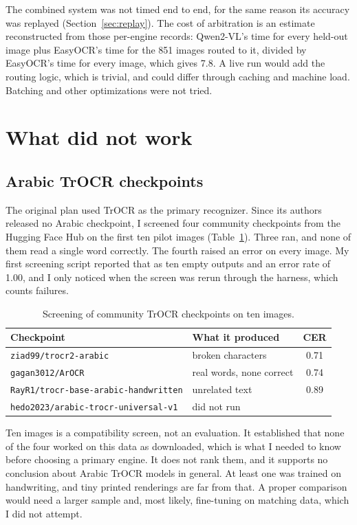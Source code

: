 \documentclass[11pt,a4paper]{article}
\begin{document}
The combined system was not timed end to end, for the same reason its
accuracy was replayed (Section~\ref{sec:replay}). The cost of arbitration is
an estimate reconstructed from those per-engine records: Qwen2-VL's time for
every held-out image plus EasyOCR's time for the 851 images routed to it,
divided by EasyOCR's time for every image, which gives 7.8. A live run would
add the routing logic, which is trivial, and could differ through caching and
machine load. Batching and other optimizations were not tried.

\section{What did not work}

\subsection{Arabic TrOCR checkpoints}

The original plan used TrOCR as the primary recognizer. Since its authors
released no Arabic checkpoint, I screened four community checkpoints from the
Hugging Face Hub on the first ten pilot images (Table~\ref{tab:trocr}). Three
ran, and none of them read a single word correctly. The fourth raised an error
on every image. My first screening script reported that as ten empty outputs
and an error rate of 1.00, and I only noticed when the screen was rerun
through the harness, which counts failures.

\begin{table}[H]
\centering
\small
\begin{tabular}{llc}
\toprule
Checkpoint & What it produced & CER \\
\midrule
\texttt{ziad99/trocr2-arabic} & broken characters & 0.71 \\
\texttt{gagan3012/ArOCR} & real words, none correct & 0.74 \\
\texttt{RayR1/trocr-base-arabic-handwritten} & unrelated text & 0.89 \\
\texttt{hedo2023/arabic-trocr-universal-v1} & did not run & \\
\bottomrule
\end{tabular}
\caption{Screening of community TrOCR checkpoints on ten images.}
\label{tab:trocr}
\end{table}

Ten images is a compatibility screen, not an evaluation. It established that
none of the four worked on this data as downloaded, which is what I needed to
know before choosing a primary engine. It does not rank them, and it supports
no conclusion about Arabic TrOCR models in general. At least one was trained
on handwriting, and tiny printed renderings are far from that. A proper
comparison would need a larger sample and, most likely, fine-tuning on
matching data, which I did not attempt.
\end{document}
